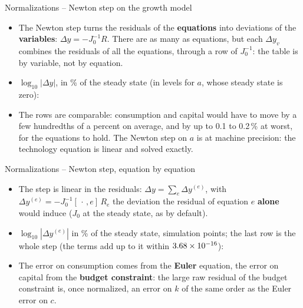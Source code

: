 \documentclass[11pt,aspectratio=169]{beamer}
\begin{document}
\begin{frame}{Normalizations -- Newton step on the growth model}

\begin{itemize}

\item The Newton step turns the residuals of the \textbf{equations} into deviations of the \textbf{variables}: $\Delta y = -J_0^{-1}R$. There are as many as equations, but each $\Delta y_v$ combines the residuals of all the equations, through a row of $J_0^{-1}$: the table is by variable, not by equation.\newline

\item $\log_{10}|\Delta y|$, in \% of the steady state (in levels for $a$, whose steady state is zero):
\begin{center}
\small

\end{center}

\item The rows are comparable: consumption and capital would have to move by a few hundredths of a percent on average, and by up to 0.1 to 0.2\,\% at worst, for the equations to hold. The Newton step on $a$ is at machine precision: the technology equation is linear and solved exactly.

\end{itemize}

\end{frame}

\begin{frame}{Normalizations -- Newton step, equation by equation}

\begin{itemize}

\item The step is linear in the residuals: $\Delta y = \sum_e \Delta y^{(e)}$, with $\Delta y^{(e)} = -J_0^{-1}[\,\cdot\,,e]\,R_e$ the deviation the residual of equation $e$ \textbf{alone} would induce ($J_0$ at the steady state, as by default).\newline

\item $\log_{10}|\Delta y^{(e)}|$ in \% of the steady state, \growthSimPoints{} simulation points; the last row is the whole step (the terms add up to it within $3.68\times10^{-16}$):
\begin{center}
\footnotesize

\end{center}

\item The error on consumption comes from the \textbf{Euler} equation, the error on capital from the \textbf{budget constraint}: the large raw residual of the budget constraint is, once normalized, an error on $k$ of the same order as the Euler error on $c$.

\end{itemize}

\end{frame}
\end{document}
